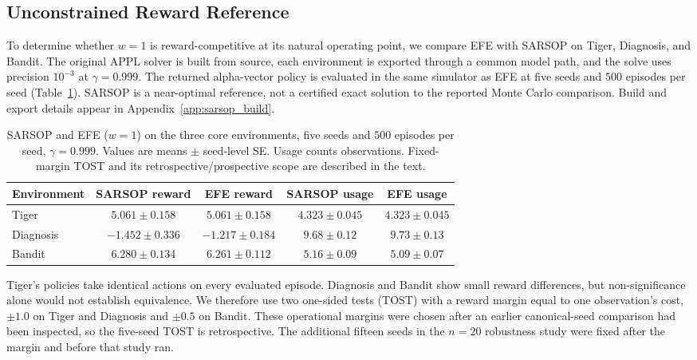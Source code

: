 \subsection{Unconstrained Reward Reference}
\label{sec:sarsop}

To determine whether $w{=}1$ is reward-competitive at its natural operating point, we compare EFE with SARSOP \citep{kurniawati2008} on Tiger, Diagnosis, and Bandit. The original APPL solver is built from source, each environment is exported through a common model path, and the solve uses precision $10^{-3}$ at $\gamma{=}0.999$. The returned alpha-vector policy is evaluated in the same simulator as EFE at five seeds and $500$ episodes per seed (Table~\ref{tab:sarsop}). SARSOP is a near-optimal reference, not a certified exact solution to the reported Monte Carlo comparison. Build and export details appear in Appendix~\ref{app:sarsop_build}.

\begin{table}[t]
\centering
\caption{SARSOP and EFE ($w{=}1$) on the three core environments, five seeds and $500$ episodes per seed, $\gamma{=}0.999$. Values are means $\pm$ seed-level SE. Usage counts observations. Fixed-margin TOST and its retrospective/prospective scope are described in the text.}
\label{tab:sarsop}
\tablefontsize
\begin{tabular}{lcccc}
\toprule
Environment & SARSOP reward & EFE reward & SARSOP usage & EFE usage \\
\midrule
Tiger & $5.061 \pm 0.158$ & $5.061 \pm 0.158$ & $4.323 \pm 0.045$ & $4.323 \pm 0.045$ \\
Diagnosis & $-1.452 \pm 0.336$ & $-1.217 \pm 0.184$ & $9.68 \pm 0.12$ & $9.73 \pm 0.13$ \\
Bandit & $6.280 \pm 0.134$ & $6.261 \pm 0.112$ & $5.16 \pm 0.09$ & $5.09 \pm 0.07$ \\
\bottomrule
\end{tabular}
\end{table}

Tiger's policies take identical actions on every evaluated episode. Diagnosis and Bandit show small reward differences, but non-significance alone would not establish equivalence. We therefore use two one-sided tests (TOST) \citep{schuirmann1987} with a reward margin equal to one observation's cost, $\pm1.0$ on Tiger and Diagnosis and $\pm0.5$ on Bandit. These operational margins were chosen after an earlier canonical-seed comparison had been inspected, so the five-seed TOST is retrospective. The additional fifteen seeds in the $n{=}20$ robustness study were fixed after the margin and before that study ran.

